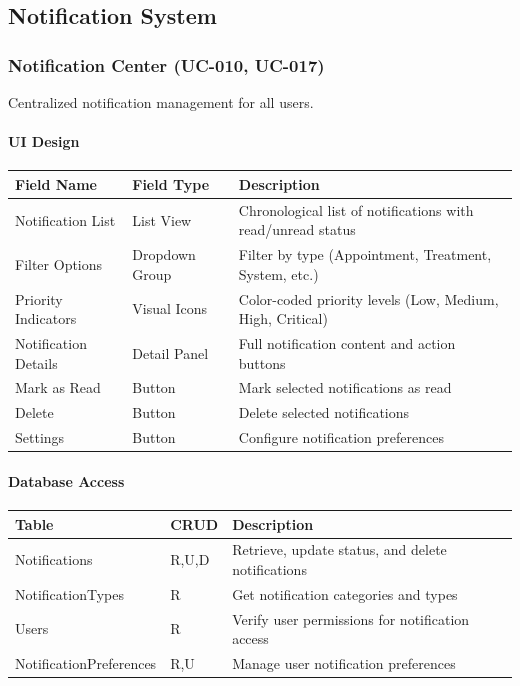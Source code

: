 \documentclass[12pt,a4paper]{article}
\begin{document}
\subsection{Notification System}

\subsubsection{Notification Center (UC-010, UC-017)}

Centralized notification management for all users.

\paragraph{UI Design}

\begin{longtable}{|p{3cm}|p{3cm}|p{8cm}|}
\hline
\textbf{Field Name} & \textbf{Field Type} & \textbf{Description} \\
\hline
Notification List & List View & Chronological list of notifications with read/unread status \\
\hline
Filter Options & Dropdown Group & Filter by type (Appointment, Treatment, System, etc.) \\
\hline
Priority Indicators & Visual Icons & Color-coded priority levels (Low, Medium, High, Critical) \\
\hline
Notification Details & Detail Panel & Full notification content and action buttons \\
\hline
Mark as Read & Button & Mark selected notifications as read \\
\hline
Delete & Button & Delete selected notifications \\
\hline
Settings & Button & Configure notification preferences \\
\hline
\end{longtable}

\paragraph{Database Access}

\begin{longtable}{|p{3cm}|p{2cm}|p{9cm}|}
\hline
\textbf{Table} & \textbf{CRUD} & \textbf{Description} \\
\hline
Notifications & R,U,D & Retrieve, update status, and delete notifications \\
\hline
NotificationTypes & R & Get notification categories and types \\
\hline
Users & R & Verify user permissions for notification access \\
\hline
NotificationPreferences & R,U & Manage user notification preferences \\
\hline
\end{longtable}
\end{document}
